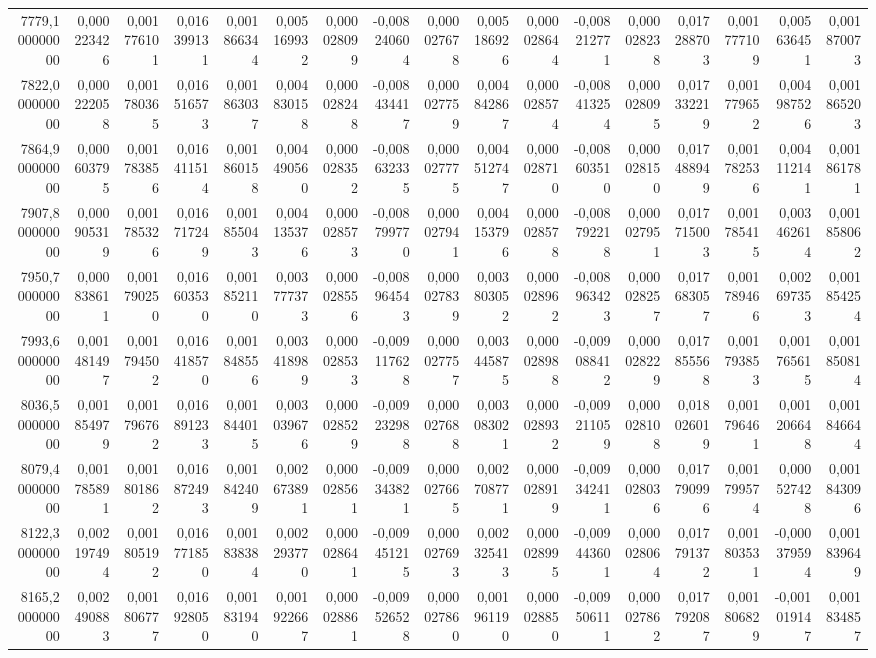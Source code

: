\begin{longtable}{rrrrrrrrrrrrrrrrr}
7779,100000000 & 0,000223426 & 0,001776101 & 0,016399131 & 0,001866344 & 0,005169932 & 0,000028099 & -0,008240604 & 0,000027678 & 0,005186926 & 0,000028644 & -0,008212771 & 0,000028238 & 0,017288703 & 0,001777109 & 0,005636451 & 0,001870073\\
7822,000000000 & 0,000222058 & 0,001780365 & 0,016516573 & 0,001863037 & 0,004830158 & 0,000028248 & -0,008434417 & 0,000027759 & 0,004842867 & 0,000028574 & -0,008413254 & 0,000028095 & 0,017332219 & 0,001779652 & 0,004987526 & 0,001865203\\
7864,900000000 & 0,000603795 & 0,001783856 & 0,016411514 & 0,001860158 & 0,004490560 & 0,000028352 & -0,008632335 & 0,000027775 & 0,004512747 & 0,000028710 & -0,008603510 & 0,000028150 & 0,017488949 & 0,001782536 & 0,004112141 & 0,001861781\\
7907,800000000 & 0,000905319 & 0,001785326 & 0,016717249 & 0,001855043 & 0,004135376 & 0,000028573 & -0,008799770 & 0,000027941 & 0,004153796 & 0,000028578 & -0,008792218 & 0,000027951 & 0,017715003 & 0,001785415 & 0,003462614 & 0,001858062\\
7950,700000000 & 0,000838611 & 0,001790250 & 0,016603530 & 0,001852110 & 0,003777373 & 0,000028556 & -0,008964543 & 0,000027839 & 0,003803052 & 0,000028962 & -0,008963423 & 0,000028257 & 0,017683057 & 0,001789466 & 0,002697353 & 0,001854254\\
7993,600000000 & 0,001481497 & 0,001794502 & 0,016418570 & 0,001848556 & 0,003418989 & 0,000028533 & -0,009117628 & 0,000027757 & 0,003445875 & 0,000028988 & -0,009088412 & 0,000028229 & 0,017855568 & 0,001793853 & 0,001765615 & 0,001850814\\
8036,500000000 & 0,001854979 & 0,001796762 & 0,016891233 & 0,001844015 & 0,003039676 & 0,000028529 & -0,009232988 & 0,000027688 & 0,003083021 & 0,000028932 & -0,009211059 & 0,000028108 & 0,018026019 & 0,001796461 & 0,001206648 & 0,001846644\\
8079,400000000 & 0,001785891 & 0,001801862 & 0,016872493 & 0,001842409 & 0,002673891 & 0,000028561 & -0,009343821 & 0,000027665 & 0,002708771 & 0,000028919 & -0,009342411 & 0,000028036 & 0,017790996 & 0,001799574 & 0,000527428 & 0,001843096\\
8122,300000000 & 0,002197494 & 0,001805192 & 0,016771850 & 0,001838384 & 0,002293770 & 0,000028641 & -0,009451215 & 0,000027693 & 0,002325413 & 0,000028995 & -0,009443601 & 0,000028064 & 0,017791372 & 0,001803531 & -0,000379594 & 0,001839649\\
8165,200000000 & 0,002490883 & 0,001806777 & 0,016928050 & 0,001831940 & 0,001922667 & 0,000028861 & -0,009526528 & 0,000027860 & 0,001961190 & 0,000028850 & -0,009506111 & 0,000027862 & 0,017792087 & 0,001806829 & -0,001019147 & 0,001834857\\

\end{longtable}
